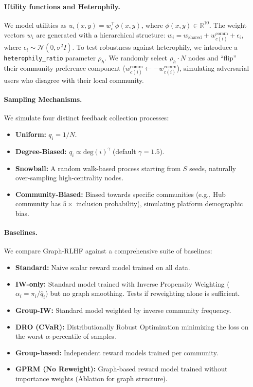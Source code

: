 \documentclass{article}
\theoremstyle{plain}
\theoremstyle{definition}
\theoremstyle{remark}
\begin{document}
\paragraph{Utility functions and Heterophily.}
We model utilities as $u_i(x,y) = w_i^\top \phi(x,y)$, where $\phi(x,y) \in \mathbb{R}^{10}$. The weight vectors $w_i$ are generated with a hierarchical structure:
$w_i = w_{\text{shared}} + w_{c(i)}^{\text{comm}} + \epsilon_i$, where $\epsilon_i \sim \mathcal{N}(0, \sigma^2 I)$.
To test robustness against heterophily, we introduce a \texttt{heterophily\_ratio} parameter $\rho_h$. We randomly select $\rho_h \cdot N$ nodes and ``flip'' their community preference component ($w_{c(i)}^{\text{comm}} \leftarrow -w_{c(i)}^{\text{comm}}$), simulating adversarial users who disagree with their local community.

\paragraph{Sampling Mechanisms.}
We simulate four distinct feedback collection processes:
\begin{itemize}
    \item \textbf{Uniform:} $q_i = 1/N$.
    \item \textbf{Degree-Biased:} $q_i \propto \text{deg}(i)^\gamma$ (default $\gamma=1.5$).
    \item \textbf{Snowball:} A random walk-based process starting from $S$ seeds, naturally over-sampling high-centrality nodes.
    \item \textbf{Community-Biased:} Biased towards specific communities (e.g., Hub community has $5\times$ inclusion probability), simulating platform demographic bias.
\end{itemize}

\paragraph{Baselines.}
We compare Graph-RLHF against a comprehensive suite of baselines:
\begin{itemize}
    \item \textbf{Standard:} Naive scalar reward model trained on all data.
    \item \textbf{IW-only:} Standard model trained with Inverse Propensity Weighting ($\alpha_i = \pi_i / \hat{q}_i$) but no graph smoothing. Tests if reweighting alone is sufficient.
    \item \textbf{Group-IW:} Standard model weighted by inverse community frequency.
    \item \textbf{DRO (CVaR):} Distributionally Robust Optimization minimizing the loss on the worst $\alpha$-percentile of samples.
    \item \textbf{Group-based:} Independent reward models trained per community.
    \item \textbf{GPRM (No Reweight):} Graph-based reward model trained without importance weights (Ablation for graph structure).
\end{itemize}
\end{document}
